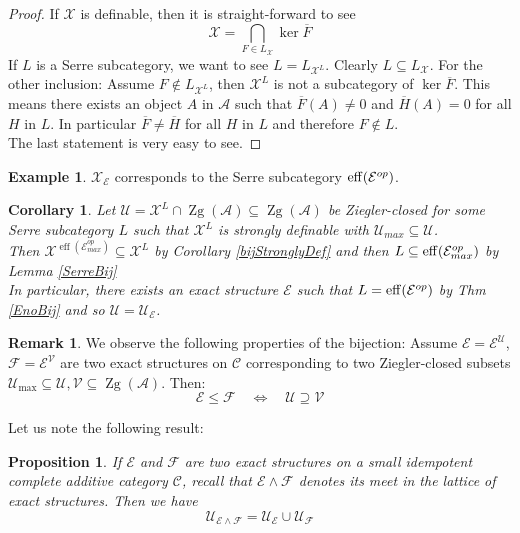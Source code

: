 \documentclass[11pt,a4paper]{amsart}
\theoremstyle{plain}
\newtheorem{pro}[thm]{Proposition}
\newtheorem{cor}[thm]{Corollary}
\theoremstyle{definition}
\newtheorem{exa}[thm]{Example}
\newtheorem{rem}[thm]{Remark}
\DeclareMathOperator{\eff}{eff}
\DeclareMathOperator{\Ker}{ker}
\newcommand{\mcA}{\mathcal{A}}
\newcommand{\mcC}{\mathcal{C}}
\newcommand{\mcE}{\mathcal{E}}
\newcommand{\mcF}{\mathcal{F}}
\newcommand{\mcU}{\mathcal{U}}
\newcommand{\mcV}{\mathcal{V}}
\newcommand{\mcX}{\mathcal{X}}
\DeclareMathOperator{\Zg}{Zg}
\begin{document}
\begin{proof}
If $\mcX$ is definable, then it is straight-forward to see
\[
\mcX= \bigcap_{F \in L_{\mcX}} \Ker \overline{F}
\]
If $L$ is a Serre subcategory, we want to see $L=L_{\mcX^{L}}$. Clearly $L\subseteq  L_{\mcX}$. For the other inclusion: Assume $F\notin L_{\mcX^L}$, then $\mcX^L$ is not a subcategory of $\Ker \overline{F}$. This means there exists an object $A$ in $\mcA$ such that $\overline{F} (A)\neq 0$ and $\overline{H} (A)=0$ for all $H$ in $L$. In particular $\overline{F}\neq \overline{H}$ for all $H$ in $L$ and therefore $F\notin L$. \\
The last statement is very easy to see. 
\end{proof}



\begin{exa}
$\mcX_{\mcE}$ corresponds to the Serre subcategory ${\rm eff}(\mcE^{op})$. 
\end{exa}

\begin{cor}
Let $\mcU=\mcX^L\cap \Zg(\mcA)\subseteq \Zg (\mcA )$ be Ziegler-closed for some Serre subcategory $L$ such that $\mcX^L$ is strongly definable with $\mcU_{max}\subseteq \mcU$.\\
Then $\mcX^{\eff(\mcE^{op}_{max})} \subseteq \mcX^L$ by Corollary \ref{bijStronglyDef} and then 
$L\subseteq {\rm eff} (\mcE^{op}_{max})$ by Lemma \ref{SerreBij}\\
In particular, there exists an exact structure $\mcE$ such that $L={\rm eff }(\mcE^{op})$ by Thm \ref{EnoBij} and so $\mcU=\mcU_{\mcE}$. 
\end{cor}

\begin{rem} \label{poset}
We observe the following properties of the bijection:
Assume $\mcE=\mcE^{\mcU}$, $\mcF=\mcE^{\mcV}$ are two exact structures on $\mcC$ corresponding to two Ziegler-closed subsets $\mcU_{\max} \subseteq \mcU, \mcV \subseteq \Zg (\mcA)$. Then: \\
\[\mcE\leq \mcF \quad \Leftrightarrow \quad \mcU \supseteq \mcV \]
\end{rem}

Let us note the following result:
\begin{pro} \label{keyForTop}
If $\mcE$ and $\mcF$ are two exact structures on a small idempotent complete additive category $\mcC$, recall that $\mcE \wedge \mcF$ denotes its meet in the lattice of exact structures. Then we have 
\[
\mcU_{\mcE\wedge \mcF} =\mcU_{\mcE}\cup \mcU_{\mcF}
\]    
\end{pro}
\end{document}
